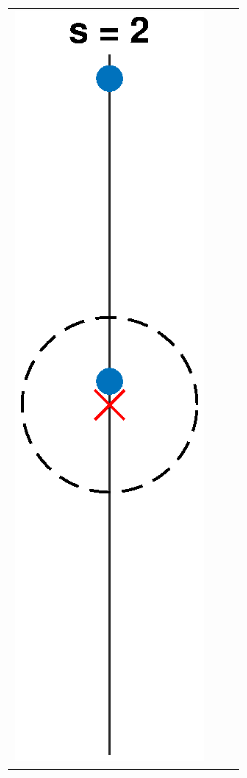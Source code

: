 \documentclass[thesis.tex]{subfiles}
\begin{document}
\begin{figure}
\begin{center}
\begin{tabular}{ccc}
\includegraphics[width=5cm]{images/kreinbubbles/bubble2R} &

\end{tabular}
\end{center}
\end{figure}
\end{document}
